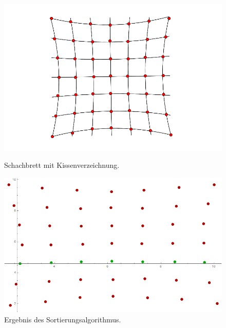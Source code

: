 \begin{figure}[!htb]
	\includegraphics[width=\linewidth]{images/KissenVerzeichnung.png}
	\caption[Schachbrett mit Kissenverzeichnung]{Schachbrett mit Kissenverzeichnung.}
	\label{fig:Extreme5}
	\endminipage\hfill
	\includegraphics[width=\linewidth]{images/AlgKissen.png}
	\caption[Sortierte Punkte eines Schachbretts mit Kissenverzeichnung ]{Ergebnis des Sortierungsalgorithmus.}
	\label{fig:Extreme6}
	\endminipage\hfill
\end{figure}

